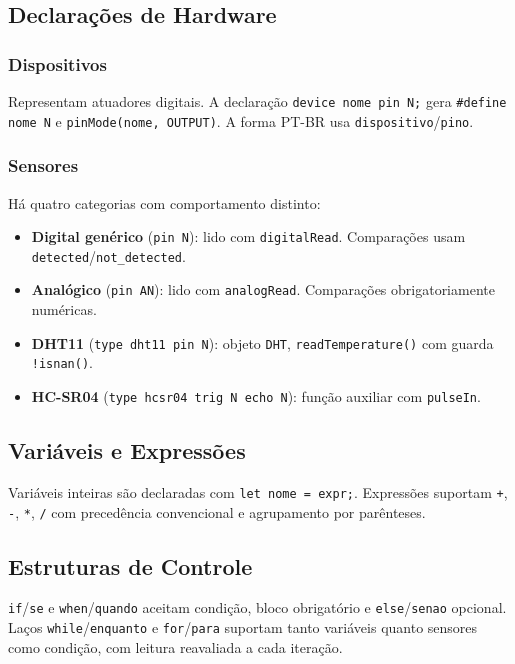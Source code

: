 \documentclass[conference]{IEEEtran}
\begin{document}
\subsection{Declarações de Hardware}

\subsubsection{Dispositivos}
Representam atuadores digitais. A declaração \texttt{device nome pin N;}
gera \texttt{\#define nome N} e \texttt{pinMode(nome, OUTPUT)}.
A forma PT-BR usa \texttt{dispositivo}/\texttt{pino}.

\subsubsection{Sensores}
Há quatro categorias com comportamento distinto:
\begin{itemize}
\item \textbf{Digital genérico} (\texttt{pin N}): lido com
\texttt{digitalRead}. Comparações usam \texttt{detected}/\texttt{not\_detected}.
\item \textbf{Analógico} (\texttt{pin AN}): lido com \texttt{analogRead}.
Comparações obrigatoriamente numéricas.
\item \textbf{DHT11} (\texttt{type dht11 pin N}): objeto \texttt{DHT},
\texttt{readTemperature()} com guarda \texttt{!isnan()}.
\item \textbf{HC-SR04} (\texttt{type hcsr04 trig N echo N}): função auxiliar
com \texttt{pulseIn}.
\end{itemize}

\subsection{Variáveis e Expressões}

Variáveis inteiras são declaradas com \texttt{let nome = expr;}. Expressões
suportam \texttt{+}, \texttt{-}, \texttt{*}, \texttt{/} com precedência
convencional e agrupamento por parênteses.

\subsection{Estruturas de Controle}
\label{subsec:controle}

\texttt{if}/\texttt{se} e \texttt{when}/\texttt{quando} aceitam condição,
bloco obrigatório e \texttt{else}/\texttt{senao} opcional. Laços
\texttt{while}/\texttt{enquanto} e \texttt{for}/\texttt{para} suportam
tanto variáveis quanto sensores como condição, com leitura reavaliada
a cada iteração.
\end{document}
